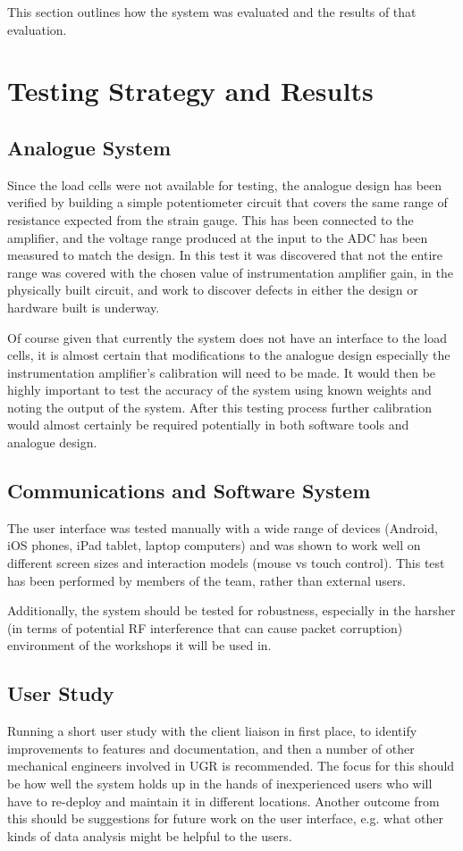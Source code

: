 This section outlines how the system was evaluated and the results of that evaluation.

\section{Testing Strategy and Results}

\subsection{Analogue System}
Since the load cells were not available for testing, the analogue design has been verified by building a simple potentiometer circuit that covers the same range of resistance expected from the strain gauge. This has been connected to the amplifier, and the voltage range produced at the input to the ADC has been measured to match the design. In this test it was discovered that not the entire range was covered with the chosen value of instrumentation amplifier gain, in the physically built circuit, and work to discover defects in either the design or hardware built is underway.

Of course given that currently the system does not have an interface to the load cells, it is almost certain that modifications to the analogue design especially the instrumentation amplifier's calibration will need to be made. It would then be highly important to test the accuracy of the system using known weights and noting the output of the system. After this testing process further calibration would almost certainly be required potentially in both software tools and analogue design. 

\subsection{Communications and Software System}
The user interface was tested manually with a wide range of devices (Android, iOS phones, iPad tablet, laptop computers) and was shown to work well on different screen sizes and interaction models (mouse vs touch control). This test has been performed by members of the team, rather than external users.

Additionally, the system should be tested for robustness, especially in the harsher (in terms of potential RF interference that can cause packet corruption) environment of the workshops it will be used in.

\subsection{User Study}
Running a short user study with the client liaison in first place, to identify improvements to features and documentation, and then a number of other mechanical engineers involved in UGR is recommended. The focus for this should be how well the system holds up in the hands of inexperienced users who will have to re-deploy and maintain it in different locations. Another outcome from this should be suggestions for future work on the user interface, e.g. what other kinds of data analysis might be helpful to the users.

